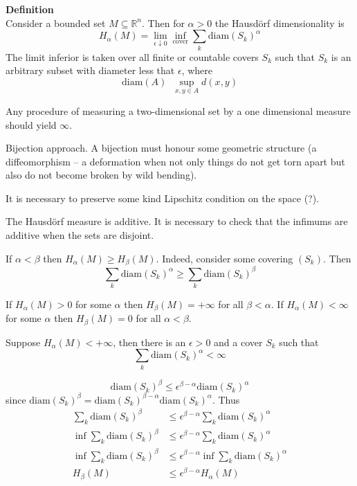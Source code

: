 \documentclass[a4paper]{article}
\newcommand{\brac}[1]{{\left ( #1 \right )}}
\newcommand{\Real}{\mathbb{R}}
\newcommand{\defn}{\mathop{\overset{\Delta}{=}}\nolimits}
\begin{document}
\noindent\textbf{Definition}\hfill\\

Consider a bounded set $M\subseteq \Real^n$. Then for $\alpha>0$ the Hausd\"orf dimensionality is 
\[H_\alpha(M) = \lim_{\epsilon\downarrow 0} \inf_{\text{cover}} \sum_{k} \text{diam}(S_k)^\alpha\]
The limit inferior is taken over all finite or countable covers $S_k$ such that $S_k$ is an arbitrary subset with diameter less that $\epsilon$, where \[\text{diam}(A) \defn \sup_{x,y\in A} d(x,y)\]

Any procedure of measuring a two-dimensional set by a one dimensional measure should yield $\infty$.

Bijection approach.
A bijection must honour some geometric structure (a diffeomorphism -- a deformation when not only things do not get torn apart but also do not become broken by wild bending).

It is necessary to preserve some kind Lipschitz condition on the space (?).

The Hausd\"orf measure is additive. It is necessary to check that
the infimums are additive when the sets are disjoint.

If $\alpha<\beta$ then $H_\alpha(M) \geq H_\beta(M)$.
Indeed, consider some covering $\brac{S_k}$. Then 
\[\sum_k \text{diam}(S_k)^\alpha \geq \sum_k \text{diam}(S_k)^\beta\]

If $H_\alpha(M) > 0$ for some $\alpha$ then $H_\beta(M) = +\infty$ for all $\beta<\alpha$.
If $H_\alpha(M) < \infty$ for some $\alpha$ then $H_\beta(M) = 0$ for all $\alpha<\beta$.

Suppose $H_\alpha(M) < +\infty$, then there is an $\epsilon>0$ and a cover $S_k$ such that 
\[\sum_k \text{diam}(S_k)^\alpha < \infty\]

\[\text{diam}(S_k)^\beta \leq \epsilon^{\beta-\alpha} \text{diam}(S_k)^\alpha \]
since $\text{diam}(S_k)^\beta = \text{diam}(S_k)^{\beta-\alpha}\text{diam}(S_k)^\alpha$.
Thus
\begin{align*}
	\sum_k \text{diam}(S_k)^\beta &\leq \epsilon^{\beta - \alpha} \sum_k \text{diam}(S_k)^\alpha\\
	\inf \sum_k \text{diam}(S_k)^\beta &\leq \epsilon^{\beta - \alpha} \sum_k \text{diam}(S_k)^\alpha\\
	\inf \sum_k \text{diam}(S_k)^\beta &\leq \epsilon^{\beta - \alpha} \inf \sum_k \text{diam}(S_k)^\alpha\\
	H_\beta(M) &\leq \epsilon^{\beta - \alpha} H_\alpha(M)
\end{align*}
\end{document}
